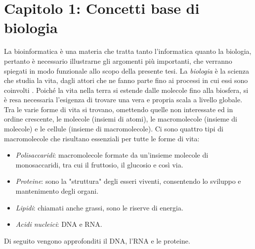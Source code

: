 \chapter{Capitolo 1: Concetti base di biologia}
La bioinformatica è una materia che tratta tanto l'informatica quanto la biologia, pertanto è necessario illustrarne gli argomenti più importanti, che verranno spiegati in modo funzionale allo scopo della presente tesi.
\newline
La \textit{biologia} è la scienza che studia la vita, dagli attori che ne fanno parte fino ai processi in cui essi sono coinvolti \cite{campbellBiology}. Poiché la vita nella terra si estende dalle molecole fino alla biosfera, si è resa necessaria l'esigenza di trovare una vera e propria scala a livello globale. Tra le varie forme di vita si trovano, omettendo quelle non interessate ed in ordine crescente, le molecole (insiemi di atomi), le macromolecole (insieme di molecole) e le cellule (insieme di macromolecole).
\newline
Ci sono quattro tipi di macromolecole che risultano essenziali per tutte le forme di vita:
\begin{itemize}
	\item \textit{Polisaccaridi}: macromolecole formate da un'insieme molecole di monosaccaridi, tra cui il fruttosio, il glucosio e così via.
	\item \textit{Proteine}: sono la "struttura" degli esseri viventi, consentendo lo sviluppo e mantenimento degli organi.
	\item \textit{Lipidi}: chiamati anche grassi, sono le riserve di energia.
	\item \textit{Acidi nucleici}: DNA e RNA.
\end{itemize}
Di seguito vengono approfonditi il DNA, l'RNA e le proteine.
\newpage

